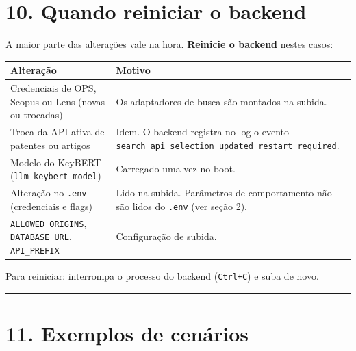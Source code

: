 \documentclass[
  brazilian,
  a4paper,12pt,oneside]{report}
\newcounter{none} %
\begin{document}
\chapter{10. Quando reiniciar o
backend}\label{quando-reiniciar-o-backend}

A maior parte das alterações vale na hora. \textbf{Reinicie o backend}
nestes casos:

{\def\LTcaptype{none} %
\begin{longtable}[]{@{}
  >{\raggedright\arraybackslash}p{}
  >{\raggedright\arraybackslash}p{}@{}}
\toprule\noalign{}
\begin{minipage}[b]{\linewidth}\raggedright
Alteração
\end{minipage} & \begin{minipage}[b]{\linewidth}\raggedright
Motivo
\end{minipage} \\
\midrule\noalign{}
\endhead
\bottomrule\noalign{}
\endlastfoot
Credenciais de OPS, Scopus ou Lens (novas ou trocadas) & Os adaptadores
de busca são montados na subida. \\
Troca da API ativa de patentes ou artigos & Idem. O backend registra no
log o evento
\texttt{search\_}\allowbreak{}\texttt{api\_}\allowbreak{}\texttt{selection\_}\allowbreak{}\texttt{updated\_}\allowbreak{}\texttt{restart\_}\allowbreak{}\texttt{required}. \\
Modelo do KeyBERT
(\texttt{llm\_}\allowbreak{}\texttt{keybert\_}\allowbreak{}\texttt{model})
& Carregado uma vez no boot. \\
Alteração no \texttt{.}\allowbreak{}\texttt{env} (credenciais e flags) &
Lido na subida. Parâmetros de comportamento não são lidos do
\texttt{.}\allowbreak{}\texttt{env} (ver
\hyperref[2-ciclo-de-vida-do-env-ao-banco]{seção 2}). \\
\texttt{ALLOWED\_}\allowbreak{}\texttt{ORIGINS},
\texttt{DATABASE\_}\allowbreak{}\texttt{URL},
\texttt{API\_}\allowbreak{}\texttt{PREFIX} & Configuração de subida. \\
\end{longtable}
}

Para reiniciar: interrompa o processo do backend (\texttt{Ctrl+C}) e
suba de novo.

\begin{center}\rule{0.5\linewidth}{0.5pt}\end{center}

\chapter{11. Exemplos de cenários}\label{exemplos-de-cenuxe1rios}
\end{document}
